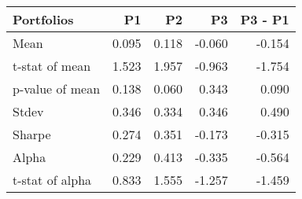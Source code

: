 \begin{tabular}{lrrrr}
\toprule
Portfolios & P1 & P2 & P3 & P3 - P1 \\
\midrule
Mean & 0.095 & 0.118 & -0.060 & -0.154 \\
t-stat of mean & 1.523 & 1.957 & -0.963 & -1.754 \\
p-value of mean & 0.138 & 0.060 & 0.343 & 0.090 \\
Stdev & 0.346 & 0.334 & 0.346 & 0.490 \\
Sharpe & 0.274 & 0.351 & -0.173 & -0.315 \\
Alpha & 0.229 & 0.413 & -0.335 & -0.564 \\
t-stat of alpha & 0.833 & 1.555 & -1.257 & -1.459 \\
\bottomrule
\end{tabular}
